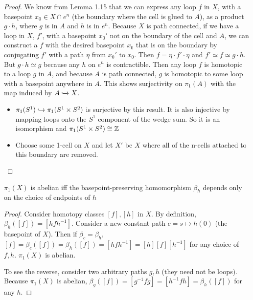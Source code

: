 \documentclass[10pt]{article}
\begin{document}
\begin{proof}

	We know from Lemma 1.15 that we can express any loop $f$ in $X$, with a
	basepoint $x_0 \in X \cap e^n$ (the boundary where the cell is glued to $A$), as a
	product $g \cdot h$, where $g$ is in $A$ and $h$ is in $e^n$. Because $X$ is
	path connected, if we have a loop in $X$, $f'$, with a basepoint $x_0'$ not
	on the boundary of the cell and $A$, we can construct a $f$ with the desired basepoint
	$x_0$ that is on the boundary by conjugating $f'$ with a path $\eta$ from $x_0'$ to $x_0$.
	Then $f = \bar{\eta} \cdot f' \cdot \eta$ and $f' \simeq f \simeq g \cdot h$.
	But $g \cdot h \simeq g$ because any $h$ on $e^n$ is contractible. Then any
	loop $f$ is homotopic to a loop $g$ in $A$, and because $A$ is path
	connected, $g$ is homotopic to some loop with a basepoint anywhere in $A$.
	This shows surjectivity on $\pi_1(A)$ with the map induced by $A \xhookrightarrow{} X$.

	\begin{itemize}
		\item{$\pi_1(S^1) \xhookrightarrow{} \pi_1(S^1 \times S^2)$ is surjective
			by this result. It is also injective by mapping loops onto the $S^1$
		component of the wedge sum. So it is an isomorphism and $\pi_1(S^1 \times S^2) \cong \mathbb{Z}$}
		\item{Choose some 1-cell on $X$ and let $X'$ be $X$ where all of the
			n-cells attached to this boundary are removed.}
	\end{itemize}
\end{proof}

\begin{exercise}[1.1.3]
	$\pi_1(X)$ is abelian iff the basepoint-preserving homomorphism $\beta_h$ depends only on the choice of endpoints of $h$
\end{exercise}

\begin{proof}

	Consider homotopy classes $[f], [h]$ in $X$. By definition, $\beta_h([f]) = [hfh^{-1}]$. Consider a new constant path $c = s \mapsto h(0)$ (the basepoint of $X$). Then if $\beta_c = \beta_h$, $[f] = \beta_c([f]) = \beta_h([f]) = [hfh^{-1}] = [h][f][h^{-1}]$ for any choice of $f, h$. $\pi_1(X)$ is abelian.

	To see the reverse, consider two arbitrary paths $g, h$ (they need not be loops). Because $\pi_1(X)$ is abelian, $\beta_g([f]) = [g^{-1}fg] = [h^{-1}fh] = \beta_h([f])$ for any $h$.

\end{proof}
\end{document}
